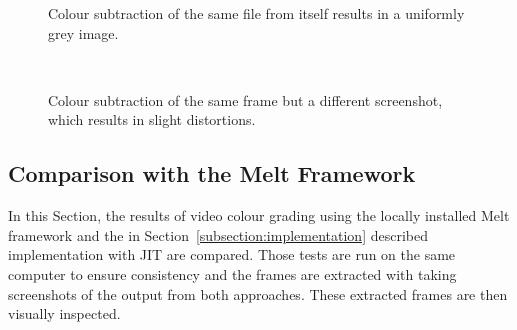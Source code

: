 \documentclass[../MasterThesis.tex]{subfiles}
\begin{document}
\begin{minipage}{0.48\textwidth}
	
	\begin{figure}[H]
		\begin{center}
			\caption[Colour subtraction of the same file from itself.]{Colour subtraction of the same file from itself results in a uniformly grey image.}
			\label{figure:greyresult_unit}
		\end{center}
	\end{figure}
\end{minipage}\begin{minipage}{0.04\textwidth}
	\ 
\end{minipage}\begin{minipage}{0.48\textwidth}	
	\begin{figure}[H]
		\begin{center}
			\caption[Colour subtraction of the same frame but a different screenshot.]{Colour subtraction of the same frame but a different screenshot, which results in slight distortions.}
			\label{figure:greyresult_blurry}
		\end{center}
	\end{figure}
\end{minipage}









\subsection{Comparison with the Melt Framework} \label{section:comparisonMelt}


In this Section, the results of video colour grading using the locally installed Melt framework and the in Section~\ref{subsection:implementation} described implementation with JIT are compared. 
Those tests are run on the same computer to ensure consistency and the frames are extracted with taking screenshots of the output from both approaches. These extracted frames are then visually inspected. 
\end{document}
